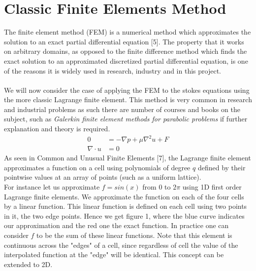 \documentclass[11pt,twoside,a4paper]{article}
\begin{document}
\section{Classic Finite Elements Method}
The finite element method (FEM) is a numerical method which approximates the solution to an exact partial differential equation [5]. The property that it works on arbitrary domains, as opposed to the finite difference method which finds the exact solution to an approximated discretized partial differential equation, is one of the reasons it is widely used in research, industry and in this project.\\
\\
We will now consider the case of applying the FEM to the stokes equations using the more classic Lagrange finite element. This method is very common in research and industrial problems as such there are number of courses and books on the subject, such as \textit{Galerkin finite element methods for parabolic problems} if further explanation and theory is required.\\
\begin{align}
0 &= -\nabla p + \mu \nabla^2 u + F \\
\nabla \cdot u &= 0
\end{align}
As seen in Common and Unusual Finite Elements [7], the Lagrange finite element approximates a function on a cell using polynomials of degree $q$ defined by their pointwise values at an array of points (such as a uniform lattice).\\
For instance let us approximate $f = sin(x)$ from $0$ to $2 \pi$ using 1D first order Lagrange finite elements. We approximate the function on each of the four cells by a linear function. This linear function is defined on each cell using two points in it, the two edge points. Hence we get figure 1, where the blue curve indicates our approximation and the red one the exact function. In practice one can consider $f$ to be the sum of these linear functions. Note that this element is continuous across the "edges" of a cell, since regardless of cell the value of the interpolated function at the "edge" will be identical. This concept can be extended to 2D.\\
\end{document}
